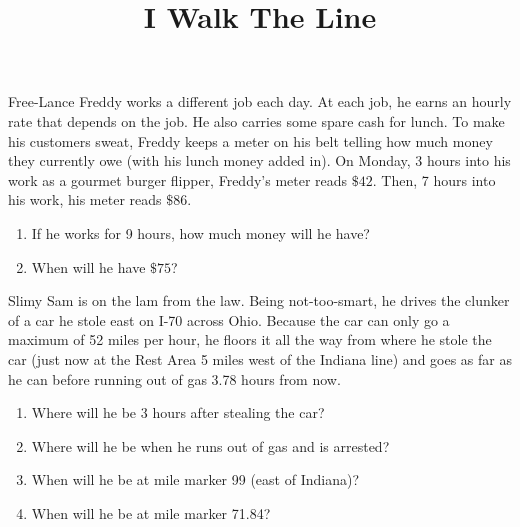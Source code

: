 \documentclass[nooutcomes, noauthor, handout]{ximera}
\title{I Walk The Line}
\begin{document}
\begin{abstract}
\end{abstract}
\maketitle


\begin{problem}
 Free-Lance Freddy works a different job each day.  At each job, he earns an hourly rate that depends on the
job.  He also carries some spare cash for lunch.  To make his
customers sweat, Freddy keeps a meter on his belt telling how much
money they currently owe (with his lunch money added in).  On Monday, 3 hours into his work as a gourmet burger flipper,
  Freddy's meter reads $\$42$. Then, 7 hours into his work, his meter reads
  $\$86$. 
  
  \begin{enumerate}
  \item  If he works for 9 hours, how much money will he have?  
  \item When will he have $\$75$?
  \end{enumerate}
  \vskip 3in
  


\end{problem}


\pagebreak
\begin{problem}
Slimy Sam is on the lam from the law.  Being not-too-smart, he drives
the clunker of a car he stole east on I-70 across Ohio.  Because the
car can only go a maximum of 52 miles per hour, he floors it all the
way from where he stole the car (just now at the Rest Area 5 miles
west of the Indiana line) and goes as far as he can before running out
of gas 3.78 hours from now.
\begin{enumerate}
 \item Where will he be 3 hours after stealing the car?
 \item Where will he be when he runs out of gas and is arrested?
 \item  When will he be at mile marker 99 (east of Indiana)?
\item When will he be at mile marker 71.84?
\end{enumerate}

\end{problem}
\end{document}
